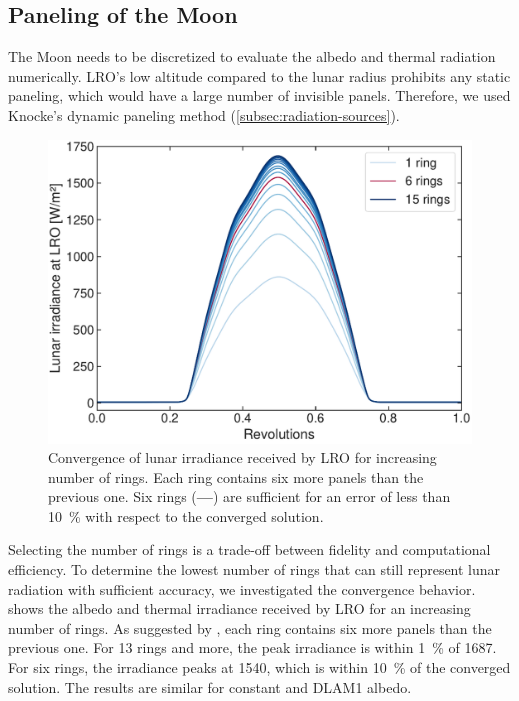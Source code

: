 \subsection{Paneling of the Moon}

The Moon needs to be discretized to evaluate the albedo and thermal radiation numerically. \gls{LRO}'s low altitude compared to the lunar radius prohibits any static paneling, which would have a large number of invisible panels. Therefore, we used Knocke's dynamic paneling method (\cref{subsec:radiation-sources}).

\begin{figure}[t]
    \centering
    \includegraphics[width=\linewidth]{figures/plots/paneling_convergence.pdf}
    \caption{Convergence of lunar irradiance received by \gls{LRO} for increasing number of rings. Each ring contains six more panels than the previous one. Six rings (\textcolor{mpl-red}{\textbf{---}}) are sufficient for an error of less than \qty{10}{\percent} with respect to the converged solution.}
    \label{fig:paneling-convergence}
\end{figure}

Selecting the number of rings is a trade-off between fidelity and computational efficiency. To determine the lowest number of rings that can still represent lunar radiation with sufficient accuracy, we investigated the convergence behavior.  shows the albedo and thermal irradiance received by \gls{LRO} for an increasing number of rings. As suggested by \citeauthor{Knocke1988}, each ring contains six more panels than the previous one. For 13 rings and more, the peak irradiance is within \qty{1}{\percent} of \qty{1687}{\irr}. For six rings, the irradiance peaks at \qty{1540}{\irr}, which is within \qty{10}{\percent} of the converged solution. The results are similar for constant and \gls{DLAM1} albedo.

